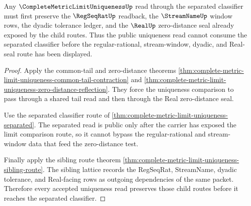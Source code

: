 \begin{theorem}
\label{thm:complete-metric-limit-uniqueness-regseqrat-forward-route}
Any $\CompleteMetricLimitUniquenessUp$ read through the separated classifier must first preserve the $\RegSeqRatUp$ readback, the $\StreamNameUp$ window rows, the dyadic tolerance ledger, and the $\RealUp$ zero-distance seal already exposed by the child routes. Thus the public uniqueness read cannot consume the separated classifier before the regular-rational, stream-window, dyadic, and Real-seal route has been displayed.
\end{theorem}
\begin{proof}
Apply the common-tail and zero-distance theorems \autoref{thm:complete-metric-limit-uniqueness-common-tail-contraction} and \autoref{thm:complete-metric-limit-uniqueness-zero-distance-reflection}. They force the uniqueness comparison to pass through a shared tail read and then through the Real zero-distance seal.

Use the separated classifier route of \autoref{thm:complete-metric-limit-uniqueness-separated}. The separated read is public only after the carrier has exposed the limit comparison route, so it cannot bypass the regular-rational and stream-window data that feed the zero-distance test.

Finally apply the sibling route theorem \autoref{thm:complete-metric-limit-uniqueness-sibling-route}. The sibling lattice records the RegSeqRat, StreamName, dyadic tolerance, and Real-facing rows as outgoing dependencies of the same packet. Therefore every accepted uniqueness read preserves those child routes before it reaches the separated classifier.
\end{proof}
